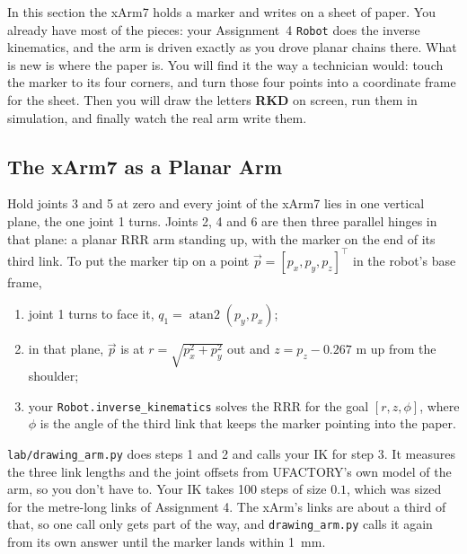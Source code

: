 \documentclass{16384_doc}
\begin{document}

In this section the xArm7 holds a marker and writes on a sheet of paper.  You
already have most of the pieces: your Assignment~4 \verb!Robot! does the
inverse kinematics, and the arm is driven exactly as you drove planar chains
there.  What is new is where the paper is.  You will find it the way a
technician would: touch the marker to its four corners, and turn those four
points into a coordinate frame for the sheet.  Then you will draw the letters
\textbf{RKD} on screen, run them in simulation, and finally watch the real arm
write them.

\subsection{The xArm7 as a Planar Arm}

Hold joints 3 and 5 at zero and every joint of the xArm7 lies in one vertical
plane, the one joint 1 turns.  Joints 2, 4 and 6 are then three parallel hinges
in that plane: a planar RRR arm standing up, with the marker on the end of its
third link.  To put the marker tip on a point $\vec{p} = [p_x, p_y, p_z]^\top$ in
the robot's base frame,
\begin{enumerate}
    \item joint 1 turns to face it, $q_1 = \operatorname{atan2}(p_y, p_x)$;
    \item in that plane, $\vec{p}$ is at $r = \sqrt{p_x^2 + p_y^2}$ out and
          $z = p_z - 0.267$ m up from the shoulder;
    \item your \verb!Robot.inverse_kinematics! solves the RRR for the goal
          $[r, z, \phi]$, where $\phi$ is the angle of the third link that keeps
          the marker pointing into the paper.
\end{enumerate}
\verb!lab/drawing_arm.py! does steps 1 and 2 and calls your IK for step 3.  It
measures the three link lengths and the joint offsets from UFACTORY's own model
of the arm, so you don't have to.  Your IK takes 100 steps of size $0.1$, which
was sized for the metre-long links of Assignment 4.  The xArm's links are about
a third of that, so one call only gets part of the way, and \verb!drawing_arm.py!
calls it again from its own answer until the marker lands within 1~mm.
\end{document}
